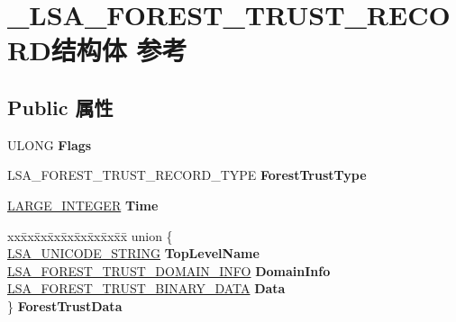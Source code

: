 \hypertarget{struct___l_s_a___f_o_r_e_s_t___t_r_u_s_t___r_e_c_o_r_d}{}\section{\+\_\+\+L\+S\+A\+\_\+\+F\+O\+R\+E\+S\+T\+\_\+\+T\+R\+U\+S\+T\+\_\+\+R\+E\+C\+O\+R\+D结构体 参考}
\label{struct___l_s_a___f_o_r_e_s_t___t_r_u_s_t___r_e_c_o_r_d}
\subsection*{Public 属性}
\begin{DoxyCompactItemize}
\item 
\mbox{\label{struct___l_s_a___f_o_r_e_s_t___t_r_u_s_t___r_e_c_o_r_d_acb933ca176b3ad8ed49317b075e2e047}} 
U\+L\+O\+NG {\bfseries Flags}
\item 
\mbox{\label{struct___l_s_a___f_o_r_e_s_t___t_r_u_s_t___r_e_c_o_r_d_adf9f395825066b55a315e3d81bb8814e}} 
L\+S\+A\+\_\+\+F\+O\+R\+E\+S\+T\+\_\+\+T\+R\+U\+S\+T\+\_\+\+R\+E\+C\+O\+R\+D\+\_\+\+T\+Y\+PE {\bfseries Forest\+Trust\+Type}
\item 
\mbox{\label{struct___l_s_a___f_o_r_e_s_t___t_r_u_s_t___r_e_c_o_r_d_a15785869d7ff39473e767c3ca4198876}} 
\hyperlink{union___l_a_r_g_e___i_n_t_e_g_e_r}{L\+A\+R\+G\+E\+\_\+\+I\+N\+T\+E\+G\+ER} {\bfseries Time}
\item 
\mbox{\label{struct___l_s_a___f_o_r_e_s_t___t_r_u_s_t___r_e_c_o_r_d_a9add44af9984341e8892cca69e190397}} 
\begin{tabbing}
xx\=xx\=xx\=xx\=xx\=xx\=xx\=xx\=xx\=\kill
union \{\\
\>\hyperlink{struct___l_s_a___u_n_i_c_o_d_e___s_t_r_i_n_g}{LSA\_UNICODE\_STRING} {\bfseries TopLevelName}\\
\>\hyperlink{struct___l_s_a___f_o_r_e_s_t___t_r_u_s_t___d_o_m_a_i_n___i_n_f_o}{LSA\_FOREST\_TRUST\_DOMAIN\_INFO} {\bfseries DomainInfo}\\
\>\hyperlink{struct___l_s_a___f_o_r_e_s_t___t_r_u_s_t___b_i_n_a_r_y___d_a_t_a}{LSA\_FOREST\_TRUST\_BINARY\_DATA} {\bfseries Data}\\
\} {\bfseries ForestTrustData}\\


\end{tabbing}
\end{DoxyCompactItemize}
